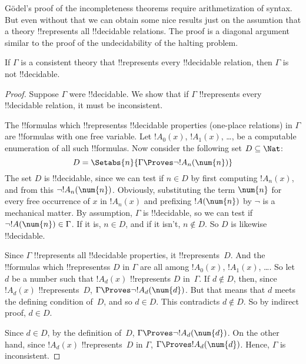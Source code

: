 \documentclass[../../../include/open-logic-section]{subfiles}
\begin{document}


G\"odel's proof of the incompleteness theorems require arithmetization
of syntax. But even without that we can obtain some nice results just
on the assumtion that a theory !!{represents} all !!{decidable}
relations.  The proof is a diagonal argument similar to the proof of
the undecidability of the halting problem.

\begin{thm}
If $\Gamma$ is a consistent theory that !!{represents} every
!!{decidable} relation, then $\Gamma$ is not !!{decidable}.
\end{thm}

\begin{proof}
Suppose $\Gamma$ were !!{decidable}. We show that if $\Gamma$
!!{represents} every !!{decidable} relation, it must be inconsistent.

The !!{formula}s which !!{represents}s !!{decidable} properties
(one-place relations) in $\Gamma$ are !!{formula}s with one free
variable. Let $!A_0(x)$, $!A_1(x)$, \dots, be a computable enumeration
of all such !!{formula}s.  Now consider the following set $D \subseteq
\Nat$:
\[
D = \Setabs{n}{\Gamma \Proves \lnot !A_n(\num{n})}
\]
The set $D$ is !!{decidable}, since we can test if $n \in D$ by first
computing $!A_n(x)$, and from this $\lnot !A_n(\num{n})$. Obviously,
substituting the term $\num{n}$ for every free occurrence of $x$ in
$!A_n(x)$ and prefixing $!A(\num{n})$ by $\lnot$ is a mechanical
matter.  By assumption, $\Gamma$ is !!{decidable}, so we can test if
$\lnot !A(\num{n}) \in \Gamma$. If it is, $n \in D$, and if it isn't,
$n \notin D$. So $D$ is likewise !!{decidable}.

Since $\Gamma$ !!{represents} all !!{decidable} properties, it
!!{represents}~$D$.  And the !!{formula}s which !!{represents}s $D$ in
$\Gamma$ are all among $!A_0(x)$, $!A_1(x)$, \dots. So let $d$ be a
number such that $!A_d(x)$ !!{represents} $D$ in~$\Gamma$.  If $d
\notin D$, then, since $!A_d(x)$ !!{represents}~$D$, $\Gamma \Proves
\lnot !A_d(\num{d})$. But that means that $d$ meets the defining
condition of~$D$, and so $d \in D$. This contradicts $d \notin D$. So
by indirect proof, $d \in D$.

Since $d \in D$, by the definition of~$D$, $\Gamma \Proves \lnot
!A_d(\num{d})$. On the other hand, since $!A_d(x)$ !!{represents}~$D$
in $\Gamma$, $\Gamma \Proves !A_d(\num{d})$. Hence, $\Gamma$ is
inconsistent.
\end{proof}
\end{document}
